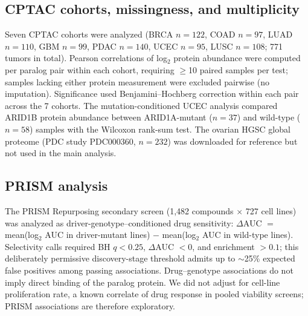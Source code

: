 \documentclass[11pt,a4paper]{article}
\begin{document}
\subsection{CPTAC cohorts, missingness, and multiplicity}
Seven CPTAC cohorts were analyzed (BRCA $n=122$, COAD $n=97$, LUAD $n=110$, GBM $n=99$, PDAC $n=140$, UCEC $n=95$, LUSC $n=108$; 771 tumors in total). Pearson correlations of log$_2$ protein abundance were computed per paralog pair within each cohort, requiring $\ge$10 paired samples per test; samples lacking either protein measurement were excluded pairwise (no imputation). Significance used Benjamini--Hochberg correction within each pair across the 7 cohorts. The mutation-conditioned UCEC analysis compared ARID1B protein abundance between ARID1A-mutant ($n=37$) and wild-type ($n=58$) samples with the Wilcoxon rank-sum test. The ovarian HGSC global proteome (PDC study PDC000360, $n=232$) was downloaded for reference but not used in the main analysis.

\subsection{PRISM analysis}
The PRISM Repurposing secondary screen (1,482 compounds $\times$ 727 cell lines) was analyzed as driver-genotype--conditioned drug sensitivity: $\Delta$AUC $=$ mean(log$_2$ AUC in driver-mutant lines) $-$ mean(log$_2$ AUC in wild-type lines). Selectivity calls required BH $q<0.25$, $\Delta$AUC $<0$, and enrichment $>0.1$; this deliberately permissive discovery-stage threshold admits up to $\sim$25\% expected false positives among passing associations. Drug--genotype associations do not imply direct binding of the paralog protein. We did not adjust for cell-line proliferation rate, a known correlate of drug response in pooled viability screens; PRISM associations are therefore exploratory.
\end{document}

